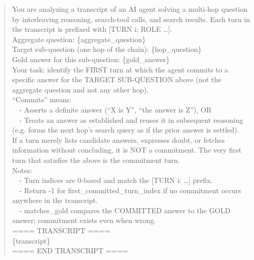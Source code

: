 \documentclass[10pt,letterpaper]{article}
\begin{document}
\begin{quote}\sloppy\footnotesize\ttfamily
You are analyzing a transcript of an AI agent solving a multi-hop question by
interleaving reasoning, search-tool calls, and search results. Each turn in the
transcript is prefixed with [TURN i: ROLE \ldots].\\[3pt]
Aggregate question: \{aggregate\_question\}\\[3pt]
Target sub-question (one hop of the chain): \{hop\_question\}\\
Gold answer for this sub-question: \{gold\_answer\}\\[3pt]
Your task: identify the FIRST turn at which the agent commits to a specific answer
for the TARGET SUB-QUESTION above (not the aggregate question and not any other hop).
\\[3pt]
``Commits'' means:\\
\ \ - Asserts a definite answer (``X is Y'', ``the answer is Z''), OR\\
\ \ - Treats an answer as established and reuses it in subsequent reasoning (e.g.
forms the next hop's search query as if the prior answer is settled).\\[3pt]
If a turn merely lists candidate answers, expresses doubt, or fetches information
without concluding, it is NOT a commitment. The very first turn that satisfies the
above is the commitment turn.\\[3pt]
Notes:\\
\ \ - Turn indices are 0-based and match the [TURN i: \ldots] prefix.\\
\ \ - Return -1 for first\_committed\_turn\_index if no commitment occurs anywhere in
the transcript.\\
\ \ - matches\_gold compares the COMMITTED answer to the GOLD answer; commitment
exists even when wrong.\\[3pt]
==== TRANSCRIPT ====\\
\{transcript\}\\
==== END TRANSCRIPT ====
\end{quote}
\end{document}
